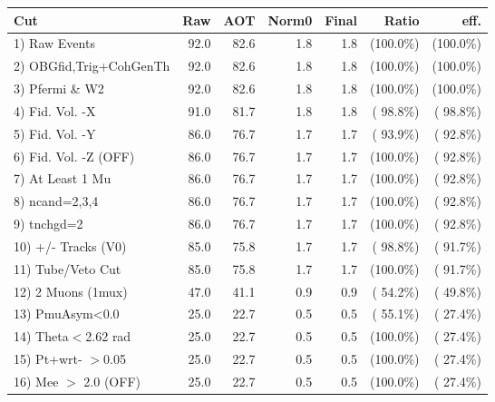  \begin{table}[h!]\centering
 \begin{tabular}{||l||r|r|r|r|r|r||}
 \hline
 \hline
 Cut & Raw & AOT & Norm0 & Final & Ratio & eff.       \\
 \hline
  1) Raw Events           &         92.0 &         82.6 &          1.8 &          1.8 & (100.0\%) & (100.0\%) \\
  2) OBGfid,Trig+CohGenTh &         92.0 &         82.6 &          1.8 &          1.8 & (100.0\%) & (100.0\%) \\
  3) Pfermi \& W2         &         92.0 &         82.6 &          1.8 &          1.8 & (100.0\%) & (100.0\%) \\
  4) Fid. Vol. -X         &         91.0 &         81.7 &          1.8 &          1.8 & ( 98.8\%) & ( 98.8\%) \\
  5) Fid. Vol. -Y         &         86.0 &         76.7 &          1.7 &          1.7 & ( 93.9\%) & ( 92.8\%) \\
  6) Fid. Vol. -Z (OFF)   &         86.0 &         76.7 &          1.7 &          1.7 & (100.0\%) & ( 92.8\%) \\
  7) At Least 1 Mu        &         86.0 &         76.7 &          1.7 &          1.7 & (100.0\%) & ( 92.8\%) \\
  8) ncand=2,3,4          &         86.0 &         76.7 &          1.7 &          1.7 & (100.0\%) & ( 92.8\%) \\
  9) tnchgd=2             &         86.0 &         76.7 &          1.7 &          1.7 & (100.0\%) & ( 92.8\%) \\
 10) +/- Tracks (V0)      &         85.0 &         75.8 &          1.7 &          1.7 & ( 98.8\%) & ( 91.7\%) \\
 11) Tube/Veto Cut        &         85.0 &         75.8 &          1.7 &          1.7 & (100.0\%) & ( 91.7\%) \\
 12) 2 Muons (1mux)       &         47.0 &         41.1 &          0.9 &          0.9 & ( 54.2\%) & ( 49.8\%) \\
 13) PmuAsym<0.0          &         25.0 &         22.7 &          0.5 &          0.5 & ( 55.1\%) & ( 27.4\%) \\
 14) Theta$<$2.62 rad     &         25.0 &         22.7 &          0.5 &          0.5 & (100.0\%) & ( 27.4\%) \\
 15) Pt+wrt- $>$0.05      &         25.0 &         22.7 &          0.5 &          0.5 & (100.0\%) & ( 27.4\%) \\
 16) Mee $>$ 2.0  (OFF)   &         25.0 &         22.7 &          0.5 &          0.5 & (100.0\%) & ( 27.4\%) \\

\end{tabular}
\end{table}
